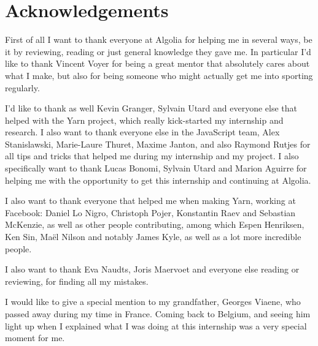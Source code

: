 
\chapter{Acknowledgements}%
\label{chp:acknowledgements}

First of all I want to thank everyone at Algolia for helping me in several ways, be it by reviewing, reading or just general knowledge they gave me. In particular I'd like to thank Vincent Voyer for being a great mentor that absolutely cares about what I make, but also for being someone who might actually get me into sporting regularly.

I'd like to thank as well Kevin Granger, Sylvain Utard and everyone else that helped with the Yarn project, which really kick-started my internship and research. I also want to thank everyone else in the JavaScript team, Alex Stanislawski, Marie-Laure Thuret, Maxime Janton, and also Raymond Rutjes for all tips and tricks that helped me during my internship and my project. I also specifically want to thank Lucas Bonomi, Sylvain Utard and Marion Aguirre for helping me with the opportunity to get this internship and continuing at Algolia.

I also want to thank everyone that helped me when making Yarn, working at Facebook: Daniel Lo Nigro, Christoph Pojer, Konstantin Raev and Sebastian McKenzie, as well as other people contributing, among which Espen Henriksen, Ken Sin, Maël Nilson and notably James Kyle, as well as a lot more incredible people.

I also want to thank Eva Naudts, Joris Maervoet and everyone else reading or reviewing, for finding all my mistakes.

I would like to give a special mention to my grandfather, Georges Viaene, who passed away during my time in France. Coming back to Belgium, and seeing him light up when I explained what I was doing at this internship was a very special moment for me. 
